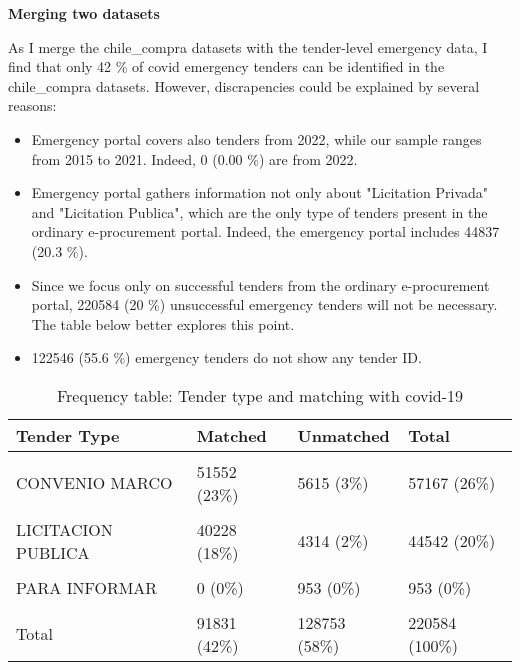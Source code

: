 \documentclass[
]{article}
\begin{document}
\textbf{Merging two datasets}

As I merge the chile\_compra datasets with the tender-level emergency
data, I find that only 42 \% of covid emergency tenders can be
identified in the chile\_compra datasets. However, discrapencies could
be explained by several reasons:

\begin{itemize}
  \item Emergency portal covers also tenders from 2022, while our sample ranges from 2015 to 2021. Indeed, 0 (0.00 \%) are from 2022. 
  \item Emergency portal gathers information not only about "Licitation Privada" and "Licitation Publica", which are the only type of tenders present in the ordinary e-procurement portal. Indeed, the emergency portal includes 44837 (20.3 \%).
  \item Since we focus only on successful tenders from the ordinary e-procurement portal, 220584 (20 \%) unsuccessful emergency tenders will not be necessary. The table below better explores this point. 
  \item 122546 (55.6 \%) emergency tenders do not show any tender ID. 
\end{itemize}

\begin{longtable}[t]{llll}
\caption{\label{tab:freq table for tag}Frequency table: Tender type and matching with covid-19}\\
\toprule
Tender Type & Matched & Unmatched & Total\\
\midrule
\cellcolor{gray!6}{COMPRA AGIL} & \cellcolor{gray!6}{0  (0\%)} & \cellcolor{gray!6}{38096 (17\%)} & \cellcolor{gray!6}{38096  (17\%)}\\
CONVENIO MARCO & 51552 (23\%) & 5615  (3\%) & 57167  (26\%)\\
\cellcolor{gray!6}{LICITACION PRIVADA} & \cellcolor{gray!6}{49  (0\%)} & \cellcolor{gray!6}{246  (0\%)} & \cellcolor{gray!6}{295   (0\%)}\\
LICITACION PUBLICA & 40228 (18\%) & 4314  (2\%) & 44542  (20\%)\\
\cellcolor{gray!6}{MICROCOMPRA} & \cellcolor{gray!6}{0  (0\%)} & \cellcolor{gray!6}{4  (0\%)} & \cellcolor{gray!6}{4   (0\%)}\\
\addlinespace
PARA INFORMAR & 0  (0\%) & 953  (0\%) & 953   (0\%)\\
\cellcolor{gray!6}{TRATO DIRECTO} & \cellcolor{gray!6}{2  (0\%)} & \cellcolor{gray!6}{79525 (36\%)} & \cellcolor{gray!6}{79527  (36\%)}\\
Total & 91831 (42\%) & 128753 (58\%) & 220584 (100\%)\\
\bottomrule
\end{longtable}
\end{document}
